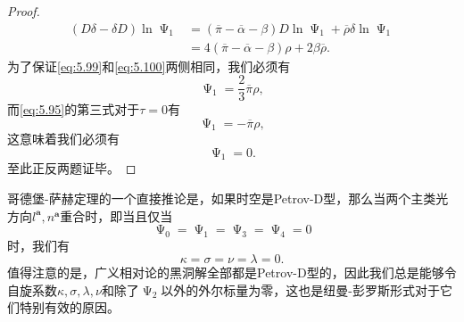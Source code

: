 \begin{proof}
	\begin{equation}
		\begin{aligned}
			(D\delta -\delta D)\ln \upPsi _{1} & =(\overline{\pi } -\overline{\alpha } -\beta )D\ln \upPsi _{1} +\overline{\rho } \delta \ln \upPsi _{1}\\
			& =4(\overline{\pi } -\overline{\alpha } -\beta )\rho +2\beta \overline{\rho } .
		\end{aligned}
		\label{eq:5.100}
	\end{equation}
	为了保证\ref{eq:5.99}和\ref{eq:5.100}两侧相同，我们必须有
	\begin{equation*}
		\upPsi _{1} =\frac{2}{3}\overline{\pi } \rho ,
	\end{equation*}
	而\ref{eq:5.95}的第三式对于$\tau =0$有
	\begin{equation*}
		\upPsi _{1} =-\overline{\pi } \rho ,
	\end{equation*}
	这意味着我们必须有
	\begin{equation*}
		\upPsi _{1} =0.
	\end{equation*}
	至此正反两题证毕。
\end{proof}

哥德堡-萨赫定理的一个直接推论是，如果时空是Petrov-D型，那么当两个主类光方向$l^{\boldsymbol{a}} ,n^{\boldsymbol{a}}$重合时，即当且仅当
\begin{equation*}
	\upPsi _{0} =\upPsi _{1} =\upPsi _{3} =\upPsi _{4} =0
\end{equation*}
时，我们有
\begin{equation*}
	\kappa =\sigma =\nu =\lambda =0.
\end{equation*}
值得注意的是，广义相对论的黑洞解全部都是Petrov-D型的\parencite{chandrasekhar1998mathematical}，因此我们总是能够令自旋系数$\kappa ,\sigma ,\lambda ,\nu $和除了$\upPsi _{2}$以外的外尔标量为零，这也是纽曼-彭罗斯形式对于它们特别有效的原因。